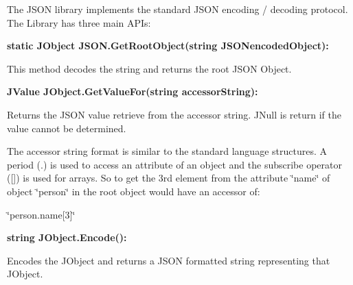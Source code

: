 The J\+S\+O\+N library implements the standard J\+S\+O\+N encoding / decoding protocol. The Library has three main A\+P\+Is\+:


\begin{DoxyItemize}
\item {\bfseries static J\+Object J\+S\+O\+N.\+Get\+Root\+Object(string J\+S\+O\+Nencoded\+Object)\+:}
\begin{DoxyItemize}
\item This method decodes the string and returns the root J\+S\+O\+N Object.
\end{DoxyItemize}
\item {\bfseries J\+Value J\+Object.\+Get\+Value\+For(string accessor\+String)\+:}
\begin{DoxyItemize}
\item Returns the J\+S\+O\+N value retrieve from the accessor string. J\+Null is return if the value cannot be determined.
\item The accessor string format is similar to the standard language structures. A period (.) is used to access an attribute of an object and the subscribe operator (\mbox{[}\mbox{]}) is used for arrays. So to get the 3rd element from the attribute \char`\"{}name\char`\"{} of object \char`\"{}person\char`\"{} in the root object would have an accessor of\+:
\begin{DoxyItemize}
\item \char`\"{}person.\+name\mbox{[}3\mbox{]}\char`\"{}
\end{DoxyItemize}
\end{DoxyItemize}
\item {\bfseries string J\+Object.\+Encode()\+:}
\begin{DoxyItemize}
\item Encodes the J\+Object and returns a J\+S\+O\+N formatted string representing that J\+Object. 
\end{DoxyItemize}
\end{DoxyItemize}